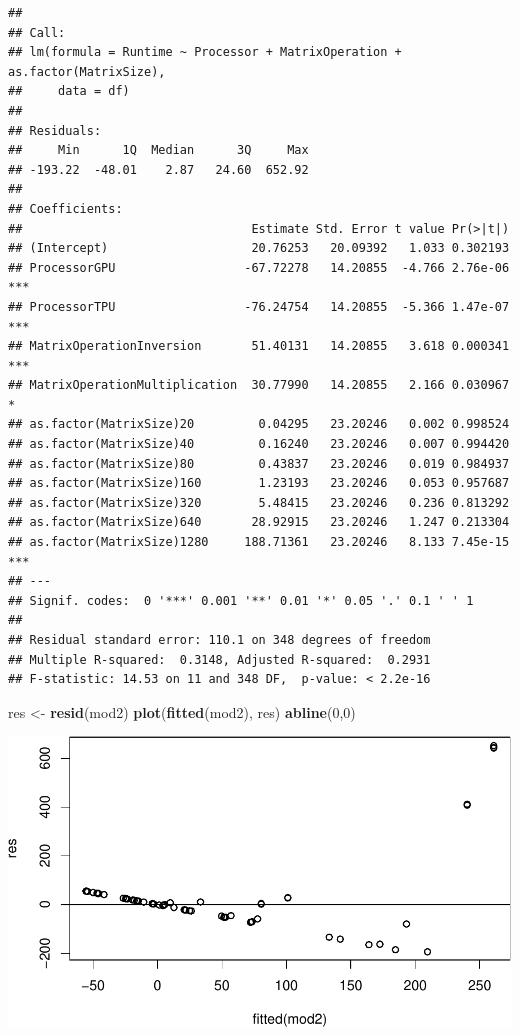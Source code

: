 \documentclass[
]{article}
\newenvironment{Shaded}{\begin{snugshade}}{\end{snugshade}}
\newcommand{\DecValTok}[1]{\textcolor[rgb]{0.00,0.00,0.81}{#1}}
\newcommand{\KeywordTok}[1]{\textcolor[rgb]{0.13,0.29,0.53}{\textbf{#1}}}
\newcommand{\NormalTok}[1]{#1}
\newcommand{\StringTok}[1]{\textcolor[rgb]{0.31,0.60,0.02}{#1}}
\begin{document}
\begin{verbatim}
## 
## Call:
## lm(formula = Runtime ~ Processor + MatrixOperation + as.factor(MatrixSize), 
##     data = df)
## 
## Residuals:
##     Min      1Q  Median      3Q     Max 
## -193.22  -48.01    2.87   24.60  652.92 
## 
## Coefficients:
##                                Estimate Std. Error t value Pr(>|t|)    
## (Intercept)                    20.76253   20.09392   1.033 0.302193    
## ProcessorGPU                  -67.72278   14.20855  -4.766 2.76e-06 ***
## ProcessorTPU                  -76.24754   14.20855  -5.366 1.47e-07 ***
## MatrixOperationInversion       51.40131   14.20855   3.618 0.000341 ***
## MatrixOperationMultiplication  30.77990   14.20855   2.166 0.030967 *  
## as.factor(MatrixSize)20         0.04295   23.20246   0.002 0.998524    
## as.factor(MatrixSize)40         0.16240   23.20246   0.007 0.994420    
## as.factor(MatrixSize)80         0.43837   23.20246   0.019 0.984937    
## as.factor(MatrixSize)160        1.23193   23.20246   0.053 0.957687    
## as.factor(MatrixSize)320        5.48415   23.20246   0.236 0.813292    
## as.factor(MatrixSize)640       28.92915   23.20246   1.247 0.213304    
## as.factor(MatrixSize)1280     188.71361   23.20246   8.133 7.45e-15 ***
## ---
## Signif. codes:  0 '***' 0.001 '**' 0.01 '*' 0.05 '.' 0.1 ' ' 1
## 
## Residual standard error: 110.1 on 348 degrees of freedom
## Multiple R-squared:  0.3148, Adjusted R-squared:  0.2931 
## F-statistic: 14.53 on 11 and 348 DF,  p-value: < 2.2e-16
\end{verbatim}

\begin{Shaded}
\begin{Highlighting}[]
\NormalTok{res \textless{}{-}}\StringTok{ }\KeywordTok{resid}\NormalTok{(mod2)}
\KeywordTok{plot}\NormalTok{(}\KeywordTok{fitted}\NormalTok{(mod2), res)}
\KeywordTok{abline}\NormalTok{(}\DecValTok{0}\NormalTok{,}\DecValTok{0}\NormalTok{)}
\end{Highlighting}
\end{Shaded}

\includegraphics{main_files/figure-latex/unnamed-chunk-27-1.pdf}
\end{document}
